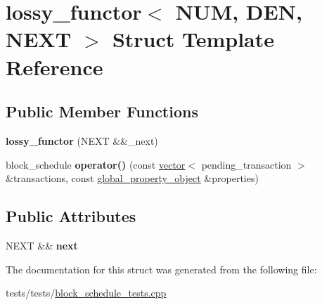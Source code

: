 \hypertarget{structlossy__functor}{}\section{lossy\+\_\+functor$<$ N\+UM, D\+EN, N\+E\+XT $>$ Struct Template Reference}
\label{structlossy__functor}
\subsection*{Public Member Functions}
\begin{DoxyCompactItemize}
\item 
\mbox{\label{structlossy__functor_a694d237adca4ff7a6c3835dd19941f40}} 
{\bfseries lossy\+\_\+functor} (N\+E\+XT \&\&\+\_\+next)
\item 
\mbox{\label{structlossy__functor_ae52b13828913d3e6f386a9d1cc9d9b7b}} 
block\+\_\+schedule {\bfseries operator()} (const \mbox{\hyperlink{classstd_1_1vector}{vector}}$<$ pending\+\_\+transaction $>$ \&transactions, const \mbox{\hyperlink{classaacio_1_1chain_1_1global__property__object}{global\+\_\+property\+\_\+object}} \&properties)
\end{DoxyCompactItemize}
\subsection*{Public Attributes}
\begin{DoxyCompactItemize}
\item 
\mbox{\label{structlossy__functor_acde62001557d9d7ce24f17f8941f4a39}} 
N\+E\+XT \&\& {\bfseries next}
\end{DoxyCompactItemize}


The documentation for this struct was generated from the following file\+:\begin{DoxyCompactItemize}
\item 
tests/tests/\mbox{\hyperlink{block__schedule__tests_8cpp}{block\+\_\+schedule\+\_\+tests.\+cpp}}\end{DoxyCompactItemize}

